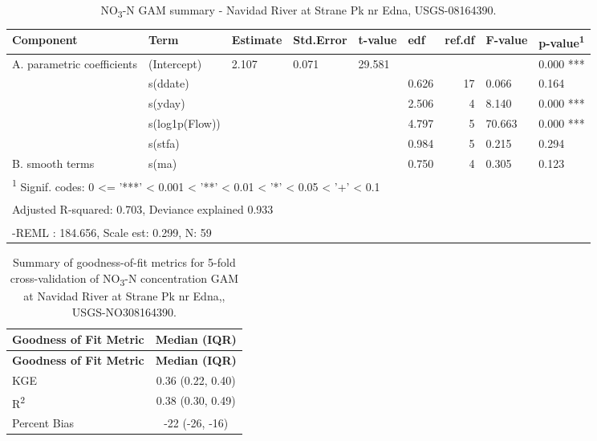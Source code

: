 \documentclass[
]{article}
\newenvironment{widestuff}{\begin{table}[h]\begin{adjustwidth}{-4.5cm}{-4.5cm}\centering}{\end{adjustwidth}\end{table}}
\begin{document}
\begin{widestuff}

\caption{NO\textsubscript{3}-N GAM summary - Navidad River at Strane Pk nr Edna, USGS-08164390.}
\centering
\begin{tabular}[t]{llllllrll}
\toprule
Component & Term & Estimate & Std.Error & t-value & edf & ref.df & F-value & p-value\textsuperscript{1}\\
\midrule
A. parametric coefficients & (Intercept) & 2.107 & 0.071 & 29.581 &  &  &  & 0.000 ***\\
\cmidrule{1-9}
 & s(ddate) &  &  &  & 0.626 & 17 & 0.066 & 0.164\\

 & s(yday) &  &  &  & 2.506 & 4 & 8.140 & 0.000 ***\\

 & s(log1p(Flow)) &  &  &  & 4.797 & 5 & 70.663 & 0.000 ***\\

 & s(stfa) &  &  &  & 0.984 & 5 & 0.215 & 0.294\\

\multirow[t]{-5}{*}{\raggedright\arraybackslash B. smooth terms} & s(ma) &  &  &  & 0.750 & 4 & 0.305 & 0.123\\
\bottomrule
\multicolumn{9}{l}{\textsuperscript{1} Signif. codes: 0 <= '***' < 0.001 < '**' < 0.01 < '*' < 0.05 < '+' < 0.1}\\
\multicolumn{9}{l}{\textsuperscript{} Adjusted R-squared: 0.703, Deviance explained 0.933}\\
\multicolumn{9}{l}{\textsuperscript{} -REML : 184.656, Scale est: 0.299, N: 59}\\
\end{tabular}
\end{widestuff}

\hypertarget{tbl-NO308164390-CV}{}
\begin{longtable}[]{@{}lc@{}}
\caption{\label{tbl-NO308164390-CV}Summary of goodness-of-fit metrics
for 5-fold cross-validation of NO\textsubscript{3}-N concentration GAM
at Navidad River at Strane Pk nr Edna,,
USGS-NO308164390.}\tabularnewline
\toprule()
\textbf{Goodness of Fit Metric} & \textbf{Median (IQR)} \\
\midrule()
\endfirsthead
\toprule()
\textbf{Goodness of Fit Metric} & \textbf{Median (IQR)} \\
\midrule()
\endhead
KGE & 0.36 (0.22, 0.40) \\
R\textsuperscript{2} & 0.38 (0.30, 0.49) \\
Percent Bias & -22 (-26, -16) \\
\bottomrule()
\end{longtable}
\end{document}
